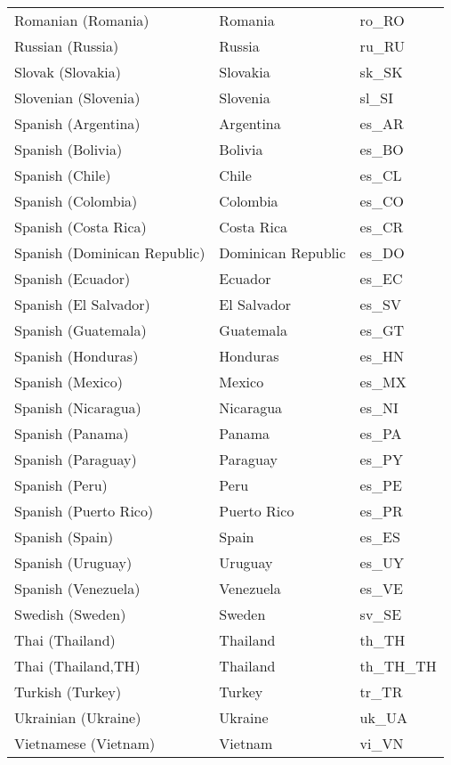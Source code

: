 \begin{supertabular}{|p{4.5cm}p{4.5cm}p{2.2cm}|}
Romanian (Romania)&Romania&ro\_RO\\
Russian (Russia)&Russia&ru\_RU\\
Slovak (Slovakia)&Slovakia&sk\_SK\\
Slovenian (Slovenia)&Slovenia&sl\_SI\\
Spanish (Argentina)&Argentina&es\_AR\\
Spanish (Bolivia)&Bolivia&es\_BO\\
Spanish (Chile)&Chile&es\_CL\\
Spanish (Colombia)&Colombia&es\_CO\\
Spanish (Costa Rica)&Costa Rica&es\_CR\\
Spanish (Dominican Republic)&Dominican Republic&es\_DO\\
Spanish (Ecuador)&Ecuador&es\_EC\\
Spanish (El Salvador)&El Salvador&es\_SV\\
Spanish (Guatemala)&Guatemala&es\_GT\\
Spanish (Honduras)&Honduras&es\_HN\\
Spanish (Mexico)&Mexico&es\_MX\\
Spanish (Nicaragua)&Nicaragua&es\_NI\\
Spanish (Panama)&Panama&es\_PA\\
Spanish (Paraguay)&Paraguay&es\_PY\\
Spanish (Peru)&Peru&es\_PE\\
Spanish (Puerto Rico)&Puerto Rico&es\_PR\\
Spanish (Spain)&Spain&es\_ES\\
Spanish (Uruguay)&Uruguay&es\_UY\\
Spanish (Venezuela)&Venezuela&es\_VE\\
Swedish (Sweden)&Sweden&sv\_SE\\
Thai (Thailand)&Thailand&th\_TH\\
Thai (Thailand,TH)&Thailand&th\_TH\_TH\\
Turkish (Turkey)&Turkey&tr\_TR\\
Ukrainian (Ukraine)&Ukraine&uk\_UA\\
Vietnamese (Vietnam)&Vietnam&vi\_VN\\
		\hline
		\end{supertabular}
